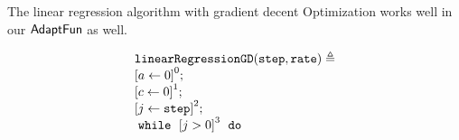 %
\begin{example}
    The linear regression algorithm with gradient decent Optimization works well 
    in our $\textsf{AdaptFun}$ as well.
\begin{figure}
\centering
\begin{subfigure}{0.55\textwidth}
    \centering
    \footnotesize{
        \[
        \begin{array}{l}
            \kw{linearRegressionGD(step, rate)} \triangleq \\
                   \clabel{ a \leftarrow 0}^{0} ; \\
                   \clabel{ c \leftarrow 0}^{1} ; \\
                    \clabel{\assign{j}{\kw{step}} }^{2} ; \\
                    \ewhile ~ \clabel{j > 0}^{3} ~ \edo ~ \\

\end{array}\]}
\end{subfigure}
\end{figure}
\end{example}
